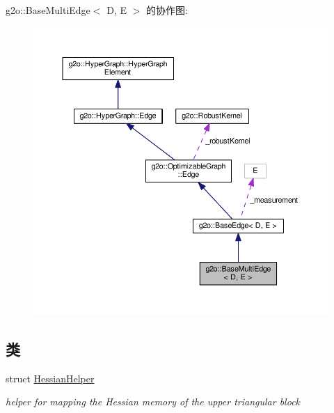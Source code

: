 g2o\-:\-:Base\-Multi\-Edge$<$ D, E $>$ 的协作图\-:
\nopagebreak
\begin{figure}[H]
\begin{center}
\leavevmode
\includegraphics[width=350pt]{classg2o_1_1BaseMultiEdge__coll__graph}
\end{center}
\end{figure}
\subsection*{类}
\begin{DoxyCompactItemize}
\item 
struct \hyperlink{structg2o_1_1BaseMultiEdge_1_1HessianHelper}{Hessian\-Helper}
\begin{DoxyCompactList}\small\item\em helper for mapping the Hessian memory of the upper triangular block \end{DoxyCompactList}\end{DoxyCompactItemize}
